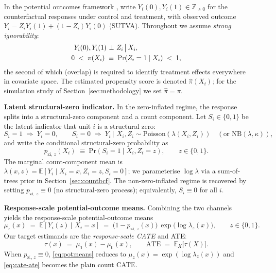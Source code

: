 \documentclass[11pt]{article}
\theoremstyle{plain}
\theoremstyle{definition}
\theoremstyle{remark}
\newcommand\independent{\protect\mathpalette{\protect\independenT}{\perp}}
\def\independenT#1#2{\mathrel{\rlap{$#1#2$}\mkern2mu{#1#2}}}
\newcommand{\Poi}{\mathrm{Poisson}}
\newcommand{\NB}{\mathrm{NB}}
\newcommand{\E}{\mathbb{E}}
\renewcommand{\Pr}{\mathrm{Pr}}
\newcommand{\muz}{\mu_{z}}
\newcommand{\muone}{\mu_{1}}
\newcommand{\muzero}{\mu_{0}}
\newcommand{\tauresp}{\tau}                 %
\newcommand{\pihat}{\widehat{\pi}}
\newcommand{\Si}{S_{i}}
\newcommand{\pzi}[1][z]{p_{\mathrm{zi},\,#1}}
\begin{document}
In the potential outcomes framework \citep{imbens2015causal}, write
$Y_i(0), Y_i(1) \in \mathbb{Z}_{\ge 0}$ for the counterfactual responses
under control and treatment, with observed outcome
$Y_i = Z_i Y_i(1) + (1 - Z_i) Y_i(0)$ (SUTVA). Throughout we assume
\emph{strong ignorability}:
\begin{align}
  Y_i(0), Y_i(1) &\independent Z_i \,\big|\, X_i, \label{eq:ignorability}\\
  0 \;<\; \pi(X_i) \;&\equiv\; \Pr(Z_i = 1 \mid X_i) \;<\; 1, \label{eq:overlap}
\end{align}
the second of which (overlap) is required to identify treatment effects
everywhere in covariate space. The estimated propensity score is denoted
$\pihat(X_i)$; for the simulation study of Section~\ref{sec:methodology}
we set $\pihat = \pi$.

\medskip
\noindent\textbf{Latent structural-zero indicator.}
In the zero-inflated regime, the response splits into a
structural-zero component and a count component. Let
$\Si \in \{0, 1\}$ be the latent indicator that unit $i$ is a
structural zero:
\begin{equation}
  \Si = 1 \;\Longrightarrow\; Y_i = 0, \qquad
  \Si = 0 \;\Longrightarrow\; Y_i \mid X_i, Z_i \sim \Poi(\lambda(X_i, Z_i))
                              \quad (\text{or } \NB(\lambda, \kappa)),
  \label{eq:Si}
\end{equation}
and write the conditional structural-zero probability as
\begin{equation}
  \pzi(X_i) \;\equiv\; \Pr(\Si = 1 \mid X_i, Z_i = z),
  \qquad z \in \{0, 1\}.
  \label{eq:pzi}
\end{equation}
The marginal count-component mean is
$\lambda(x, z) = \E[Y_i \mid X_i = x, Z_i = z, \Si = 0]$; we
parameterise $\log \lambda$ via a sum-of-trees prior in
Section~\ref{sec:countbcf}. The non-zero-inflated regime is recovered
by setting $\pzi \equiv 0$ (no structural-zero process); equivalently,
$\Si \equiv 0$ for all $i$.

\medskip
\noindent\textbf{Response-scale potential-outcome means.}
Combining the two channels yields the response-scale potential-outcome
means
\begin{equation}
  \muz(x) \;=\; \E[Y_i(z) \mid X_i = x]
          \;=\; \bigl(1 - \pzi(x)\bigr) \,\exp\bigl(\log \lambda_z(x)\bigr),
  \qquad z \in \{0, 1\}.
  \label{eq:potmeans}
\end{equation}
Our target estimands are the \emph{response-scale CATE} and ATE:
\begin{equation}
  \tauresp(x) \;=\; \muone(x) - \muzero(x), \qquad
  \mathrm{ATE} \;=\; \E_{X}\!\bigl[\tauresp(X)\bigr].
  \label{eq:cate-ate}
\end{equation}
When $\pzi \equiv 0$, \eqref{eq:potmeans} reduces to
$\muz(x) = \exp(\log\lambda_z(x))$ and \eqref{eq:cate-ate} becomes the
plain count CATE.
\end{document}
